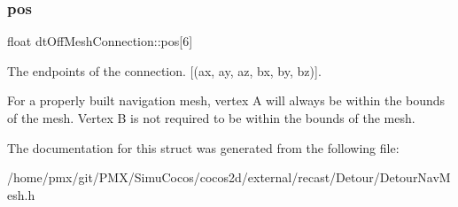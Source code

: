 \subsubsection{\texorpdfstring{pos}{pos}}
{\footnotesize\ttfamily float dt\+Off\+Mesh\+Connection\+::pos\mbox{[}6\mbox{]}}



The endpoints of the connection. \mbox{[}(ax, ay, az, bx, by, bz)\mbox{]}. 

\begin{DoxyParagraph}{}

\end{DoxyParagraph}
For a properly built navigation mesh, vertex A will always be within the bounds of the mesh. Vertex B is not required to be within the bounds of the mesh. 

The documentation for this struct was generated from the following file\+:\begin{DoxyCompactItemize}
\item 
/home/pmx/git/\+P\+M\+X/\+Simu\+Cocos/cocos2d/external/recast/\+Detour/Detour\+Nav\+Mesh.\+h\end{DoxyCompactItemize}
